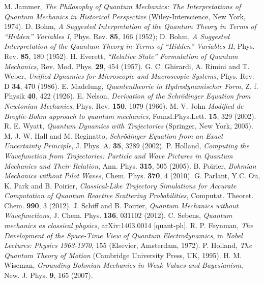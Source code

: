 \documentclass[12pt, aps,pra,amsmath,amssymb,superscriptaddress]{revtex4-2}
\renewcommand{\(}{\left(}
\renewcommand{\)}{\right)}
\begin{document}
{\begin{thebibliography}{99}

 M. Jammer, {\it The Philosophy of Quantum Mechanics: The Interpretations of Quantum Mechanics in Historical Perspective} (Wiley-Interscience, New York, 1974). 
 D. Bohm, {\it A Suggested Interpretation of the Quantum Theory in Terms of ``Hidden'' Variables I}, Phys. Rev. {\bf 85}, 166 (1952); D. Bohm, {\it A Suggested Interpretation of the Quantum Theory in Terms of ``Hidden'' Variables II}, Phys. Rev. {\bf 85}, 180 (1952).
 H. Everett, {\it ``Relative State'' Formulation of Quantum Mechanics}, Rev. Mod. Phys. {\bf 29}, 454 (1957).
 G. C. Ghirardi, A. Rimini and T. Weber, {\it Unified Dynamics for Microscopic and Macroscopic Systems}, Phys. Rev. D {\bf 34}, 470 (1986). 
 E. Madelung, {\it Quantentheorie in Hydrodynamischer Form}, Z. f. Physik {\bf 40}, 422 (1926).
 E. Nelson, {\it Derivation of the Schr\"odinger Equation from Newtonian Mechanics}, Phys. Rev. {\bf 150}, 1079 (1966).
 M. V. John {\it Modified de Broglie-Bohm
approach to quantum mechanics}, Found.Phys.Lett. {\bf 15}, 329 (2002).
  R. E. Wyatt, {\it Quantum Dynamics with Trajectories}
 (Springer, New York, 2005).
 M. J. W. Hall and M. Reginatto, {\it Schr\"odinger Equation from an Exact Uncertainty Principle}, J. Phys. A. {\bf 35}, 3289 (2002).
 P. Holland, {\it Computing the Wavefunction from
Trajectories: Particle and Wave Pictures
in Quantum Mechanics and Their Relation}, Ann. Phys. {\bf 315}, 505 (2005).
 B. Poirier, {\it Bohmian Mechanics without Pilot Waves},  Chem. Phys. {\bf 370}, 4 (2010).
 G. Parlant, Y.C. Ou, K. Park and B. Poirier, {\it Classical-Like Trajectory Simulations for Accurate Computation of Quantum Reactive Scattering Probabilities},
  Computat. Theoret. Chem. {\bf 990}, 3 (2012).
 J. Schiff and B. Poirier, {\it Quantum Mechanics without Wavefunctions}, J. Chem. Phys. {\bf 136}, 031102 (2012).
 C. Sebens, {\it Quantum mechanics as classical physics},  arXiv:1403.0014 [quant-ph].  
 R. P. Feynman, {\it The Development of the Space-Time View of
    Quantum Electrodynamics}, in {\it Nobel Lectures: Physics 1963-1970}, 155 (Elsevier, Amsterdam, 1972).  
 P. Holland, {\it The Quantum Theory of Motion} (Cambridge University Press, UK, 1995).
 H. M. Wiseman, {\it Grounding Bohmian Mechanics in Weak Values and Bayesianism}, New. J. Phys. {\bf 9}, 165 (2007).

\end{thebibliography}}
\end{document}

